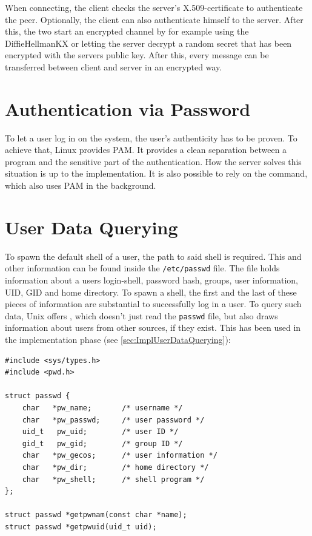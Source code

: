 \documentclass[10pt,a4paper,titlepage,twoside,english,final]{zhawreprt}
\begin{document}
When connecting, the client checks the server's \gls{X.509}-certificate to authenticate the peer.
Optionally, the client can also authenticate himself to the server.
After this, the two start an encrypted channel by for example using the \gls{DiffieHellmanKX} or letting the server decrypt a random secret that has been encrypted with the servers public key.
After this, every message can be transferred between client and server in an encrypted way.

\section{Authentication via Password}\label{sec:DesignAuthViaPw}
To let a user log in on the system, the user's authenticity has to be proven.
To achieve that, \gls{Linux} provides \gls{PAM}.
It provides a clean separation between a program and the sensitive part of the authentication.
How the server solves this situation is up to the implementation.
It is also possible to rely on the \cite{login} command, which also uses \gls{PAM} in the background.

\section{User Data Querying}\label{sec:DesignUserDataQuerying}
To spawn the default \gls{shell} of a user, the path to said \gls{shell} is required.
This and other information can be found inside the \texttt{/etc/passwd} file.
The file holds information about a users \gls{login}-\gls{shell}, password hash, groups, user information, \gls{UID}, \gls{GID} and home directory.
To spawn a \gls{shell}, the first and the last of these pieces of information are substantial to successfully log in a user.
To query such data, \gls{Unix} offers \cite{getpw}, which doesn't just read the \texttt{passwd} file, but also draws information about users from other sources, if they exist.
This has been used in the implementation phase (see \ref{sec:ImplUserDataQuerying}):
\setlistingC
\begin{lstlisting}[caption={Definition of passwd and {\cite{getpw}}},label=lst:PasswdDefinition]
#include <sys/types.h>
#include <pwd.h>

struct passwd {
	char   *pw_name;       /* username */
	char   *pw_passwd;     /* user password */
	uid_t   pw_uid;        /* user ID */
	gid_t   pw_gid;        /* group ID */
	char   *pw_gecos;      /* user information */
	char   *pw_dir;        /* home directory */
	char   *pw_shell;      /* shell program */
};

struct passwd *getpwnam(const char *name);
struct passwd *getpwuid(uid_t uid);
\end{lstlisting}
\end{document}
